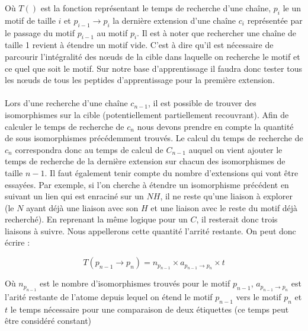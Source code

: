\documentclass[12pt,french,twoside]{report}
\begin{document}
Où $T()$ est la fonction représentant le temps de recherche d'une chaîne, $p_i$ le un motif de taille $i$ et $p_{i-1} \rightarrow
p_i$ la dernière extension d'une chaîne $c_i$ représentée par le passage du motif $p_{i-1}$ au motif $p_i$. Il est à noter que
rechercher une chaîne de taille 1 revient à étendre un motif vide. C'est à dire qu'il est nécessaire de parcourir l'intégralité
des n\oe{}uds de la cible dans laquelle on recherche le motif et ce quel que soit le motif. Sur notre base d'apprentissage il faudra
donc tester tous les n\oe{}uds de tous les peptides d'apprentissage pour la première extension.
% 

\paragraph{}Lors d'une recherche d'une chaîne $c_{n-1}$, il est possible de trouver des isomorphismes sur la cible (potentiellement partiellement recouvrant).
Afin de calculer le temps de recherche de $c_n$ nous devons prendre en compte la quantité de sous isomorphismes précédemment trouvés.
Le calcul du temps de recherche de $c_n$ correspondra donc au temps de calcul de $C_{n-1}$ auquel on vient ajouter le temps de recherche de la dernière extension sur chacun des isomorphismes de taille $n-1$.
Il faut également tenir compte du nombre d'extensions qui vont être essayées.
Par exemple, si l'on cherche à étendre un isomorphisme précédent en suivant un lien qui est enraciné sur un $NH$, il ne reste qu'une liaison à explorer (le $N$ ayant déjà une liaison avec son $H$ et une liaison avec le reste du motif déjà recherché).
En reprenant la même logique pour un $C$, il resterait donc trois liaisons à suivre.
Nous appellerons cette quantité l'arrité restante.
On peut donc écrire :

\begin{equation}
 T(p_{n-1} \rightarrow p_n) = n_{p_{n-1}} \times a_{p_{n-1} \rightarrow p_n} \times t
\end{equation}

Où $n_{p_{n-1}}$ est le nombre d'isomorphismes trouvés pour le motif $p_{n-1}$, $a_{p_{n-1} \rightarrow p_n}$ est l'arité restante
de l'atome depuis lequel on étend le motif $p_{n-1}$ vers le motif $p_n$ et $t$ le temps nécessaire pour une comparaison de deux
étiquettes (ce temps peut être considéré constant)
\end{document}
